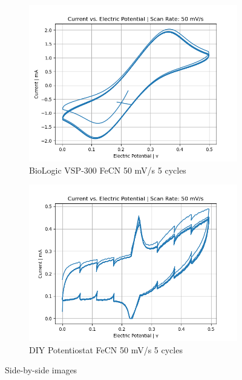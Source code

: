 \documentclass{article}
\begin{document}
\begin{figure}[H]
  \centering
  \begin{subfigure}[b]{0.45\textwidth}
    \includegraphics[width=\textwidth]{FECN_50mVs_5cycles_lab.png}
    \caption{BioLogic VSP-300 FeCN 50 mV/s 5 cycles}
  \end{subfigure}
  \hfill
  \begin{subfigure}[b]{0.45\textwidth}
    \includegraphics[width=\textwidth]{FECN_50mVs_5cycles.png}
    \caption{DIY Potentiostat FeCN 50 mV/s 5 cycles}
  \end{subfigure}
  \caption{Side-by-side images}
\end{figure}
\end{document}
